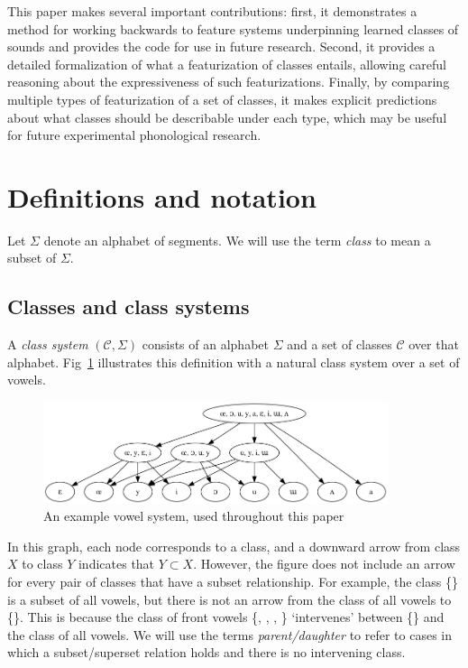 \documentclass[11pt, oneside]{article}   	%
\begin{document}
This paper makes several important contributions: first, it demonstrates a method for working backwards to feature systems underpinning learned classes of sounds and provides the code for use in future research. Second, it provides a detailed formalization of what a featurization of classes entails, allowing careful reasoning about the expressiveness of such featurizations. Finally, by comparing multiple types of featurization of a set of classes, it makes explicit predictions about what classes should be describable under each type, which may be useful for future experimental phonological research.

\section{Definitions and notation}

Let $\Sigma$ denote an alphabet of segments. We will use the term \textit{class} to mean a subset of $\Sigma$.

\subsection{Classes and class systems}

A \textit{class system} $(\mathcal C, \Sigma)$ consists of an alphabet $\Sigma$ and a set of classes $\mathcal C$ over that alphabet. Fig~\ref{fig:lattice} illustrates this definition with a natural class system over a set of vowels.

\begin{figure}[h]
\includegraphics[width=0.9\textwidth]{vowelHarmony_unicode.png}
\caption{An example vowel system, used throughout this paper}
\label{fig:lattice}
\end{figure}

In this graph, each node corresponds to a class, and a downward arrow from class $X$ to class $Y$ indicates that $Y \subset X$. However, the figure does not include an arrow for every pair of classes that have a subset relationship. For example, the class \{\} is a subset of all vowels, but there is not an arrow from the class of all vowels to \{\}. This is because the class of front vowels \{\textipa{\oe}, , , \} `intervenes' between \{\} and the class of all vowels. We will use the terms \textit{parent/daughter} to refer to cases in which a subset/superset relation holds and there is no intervening class.
\end{document}
